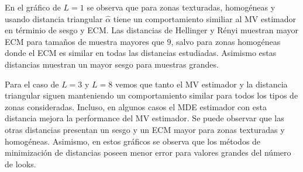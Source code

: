  En el gráfico de $L=1$ se observa que para zonas texturadas, homogéneas y usando distancia triangular $\widehat{\alpha}$  tiene un comportamiento similiar al MV estimador en términio de sesgo y ECM. Las distancias de Hellinger y Rényi muestran mayor ECM para tamaños de muestra mayores que $9$, salvo para zonas homogéneas donde el ECM es similar en todas las distancias estudiadas. Asimismo estas distancias muestran un mayor sesgo para muestras grandes.

Para el caso de $L=3$ y $L=8$ vemos que tanto el MV estimador y la distancia triangular siguen manteniendo un comportamiento similar para todos los tipos de zonas consideradas. Incluso, en algunos casos el MDE estimador con esta distancia mejora la performance del MV estimador. Se puede observar que las otras distancias presentan un sesgo y un ECM mayor para zonas texturadas y homogéneas. Asimismo, en estos gráficos se observa que los métodos de minimización de distancias poseen menor error para valores grandes del número de looks. 

